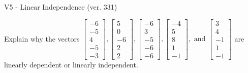 \begin{exercise}
  \begin{exerciseTitle}V5 - Linear Independence (ver. 331)\end{exerciseTitle}
  \begin{exerciseStatement}
    Explain why the vectors \(\left[\begin{array}{r}
-6 \\
-5 \\
4 \\
-5 \\
-3
\end{array}\right] , \left[\begin{array}{r}
5 \\
0 \\
-6 \\
2 \\
2
\end{array}\right] , \left[\begin{array}{r}
-6 \\
3 \\
-5 \\
-6 \\
-6
\end{array}\right] , \left[\begin{array}{r}
-4 \\
5 \\
8 \\
1 \\
-1
\end{array}\right] , \text{ and } \left[\begin{array}{r}
3 \\
4 \\
-1 \\
1 \\
-1
\end{array}\right]\) are linearly dependent or linearly independent.	



\end{exerciseStatement}
\end{exercise}
